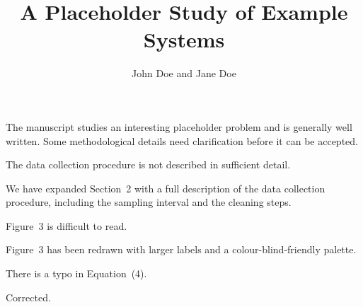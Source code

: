 \documentclass[11pt]{authorresponseletter}
\title{A Placeholder Study of Example Systems}
\author{John Doe and Jane Doe}
\begin{document}
\maketitle

\reviewer

\begin{generalcomment}
The manuscript studies an interesting placeholder problem and is generally well written. Some methodological details need clarification before it can be accepted.
\end{generalcomment}

\begin{generalresponse}
\end{generalresponse}

\begin{revcomment}
The data collection procedure is not described in sufficient detail.
\end{revcomment}
\begin{revresponse}
We have expanded Section~2 with a full description of the data collection procedure, including the sampling interval and the cleaning steps.
\end{revresponse}

\begin{revcomment}
Figure~3 is difficult to read.
\end{revcomment}
\begin{revresponse}
Figure~3 has been redrawn with larger labels and a colour-blind-friendly palette.
\end{revresponse}

\begin{revcomment}
There is a typo in Equation~(4).
\end{revcomment}
\begin{revresponse}[]
Corrected.
\end{revresponse}
\end{document}
